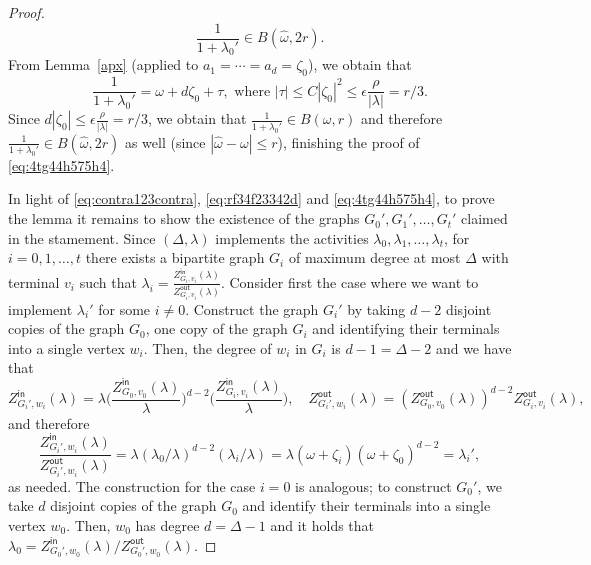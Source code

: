 \documentclass[11pt]{article}
\def\Zin{Z^{\mathsf{in}}}
\def\Zout{Z^{\mathsf{out}}}
\newcommand{\eps}{\epsilon}
\begin{document}
\begin{proof}
\begin{equation}\label{eq:4tg44h575h4}
\frac{1}{1+\lambda_{0}'}\in B(\hat{\omega},2r).
\end{equation}
From Lemma~\ref{apx} (applied to $a_1=\cdots=a_d=\zeta_0$), we obtain that
\[\frac{1}{1+\lambda_{0}'}=\omega+d\zeta_0+\tau, \mbox{ where } |\tau|\leq C|\zeta_0|^2\leq \eps \frac{\rho}{|\lambda|}=r/3.\]
Since $d|\zeta_0|\leq \eps \frac{\rho}{|\lambda|}= r/3$, we obtain that $\frac{1}{1+\lambda_{0}'}\in B(\omega,r)$ and therefore $\frac{1}{1+\lambda_{0}'}\in B(\hat{\omega},2r)$ as well (since $|\hat{\omega}-\omega|\leq r$), finishing the proof of \eqref{eq:4tg44h575h4}.

In light of \eqref{eq:contra123contra}, \eqref{eq:rf34f23342d} and \eqref{eq:4tg44h575h4}, to prove the lemma it remains to show the existence of the graphs $G_0',G_1',\hdots, G_t'$ claimed in the stamement. Since $(\Delta,\lambda)$ implements the activities $\lambda_0,\lambda_1,\hdots,\lambda_t$, for $i=0,1,\hdots,t$ there exists a bipartite graph $G_i$ of maximum degree at most $\Delta$ with terminal $v_i$ such that $\lambda_i=\frac{\Zin_{G_i,v_i}(\lambda)}{\Zout_{G_i,v_i}(\lambda)}$. Consider first the case where we want to implement $\lambda_i'$ for some $i\neq 0$. Construct the graph $G_i'$ by taking $d-2$ disjoint copies of the graph $G_0$, one copy of the graph $G_i$ and identifying their terminals into a single vertex $w_i$. Then, the degree of $w_i$ in $G_i$ is $d-1=\Delta-2$ and we have that
\[\Zin_{G_i',w_i}(\lambda)=\lambda\Big(\frac{\Zin_{G_0,v_0}(\lambda)}{\lambda}\Big)^{d-2}\Big(\frac{\Zin_{G_i,v_i}(\lambda)}{\lambda}\Big), \quad \Zout_{G_i',w_i}(\lambda)=(\Zout_{G_0,v_0}(\lambda))^{d-2}\Zout_{G_i,v_i}(\lambda),\]
and therefore 
\[\frac{\Zin_{G_i',w_i}(\lambda)}{\Zout_{G_i',w_i}(\lambda)}=\lambda (\lambda_0/\lambda)^{d-2}(\lambda_i/\lambda)=\lambda(\omega+\zeta_i)(\omega+\zeta_0)^{d-2}=\lambda_i',\]
as needed. The construction for the case $i=0$ is analogous; to construct $G_0'$, we take $d$ disjoint copies of the graph $G_0$ and identify their terminals into a single vertex $w_0$. Then, $w_0$ has degree $d=\Delta-1$ and it holds that $\lambda_0=\Zin_{G_0',w_0}(\lambda)/\Zout_{G_0',w_0}(\lambda)$.
\end{proof}
\end{document}
